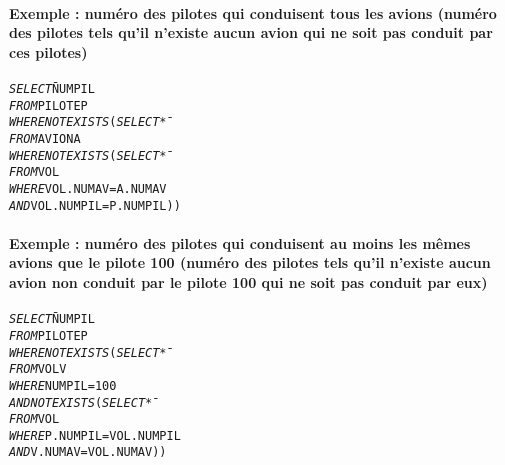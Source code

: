 \documentclass[10pt]{article}
\begin{document}
				\paragraph{Exemple : numéro des pilotes qui conduisent tous les avions (numéro des pilotes tels qu'il n'existe aucun avion qui ne soit pas conduit par ces pilotes)}
					\begin{alltt}
						\begin{tabbing}
							\emph{SELECT}\= NUMPIL\\
							\emph{FROM}\> PILOTE P\\
							\emph{WHERE} \> \emph{NOT EXISTS} (\=\emph{SELECT}\= *\\
															\>\>\emph{FROM}\> AVION A\\
															\>\>\emph{WHERE}\> \emph{NOT EXISTS} (\=\emph{SELECT}\= *\\
																							\>\>\>\>\emph{FROM}\> VOL\\
																							\>\>\>\>\emph{WHERE} \> VOL.NUMAV=A.NUMAV\\
																							\>\>\>\>			\> \emph{AND} VOL.NUMPIL=P.NUMPIL))
						\end{tabbing}
					\end{alltt}
				
				\newpage
				\paragraph{Exemple : numéro des pilotes qui conduisent au moins les mêmes avions que le pilote 100 (numéro des pilotes tels qu'il n'existe aucun avion non conduit par le pilote 100 qui ne soit pas conduit par eux)}
					\begin{alltt}
						\begin{tabbing}
							\emph{SELECT}\= NUMPIL\\
							\emph{FROM}\> PILOTE P\\
							\emph{WHERE} \> \emph{NOT EXISTS} (\=\emph{SELECT}\= *\\
															\>\>\emph{FROM}\> VOL V\\
															\>\>\emph{WHERE} \> NUMPIL=100\\
															\>\>\> \emph{AND NOT EXISTS} (\=\emph{SELECT}\= *\\
																							\>\>\>\>\emph{FROM}\> VOL\\
																							\>\>\>\>\emph{WHERE} \> P.NUMPIL=VOL.NUMPIL\\
																							\>\>\>\>			\> \emph{AND} V.NUMAV=VOL.NUMAV))
						\end{tabbing}
					\end{alltt}
		
\end{document}

